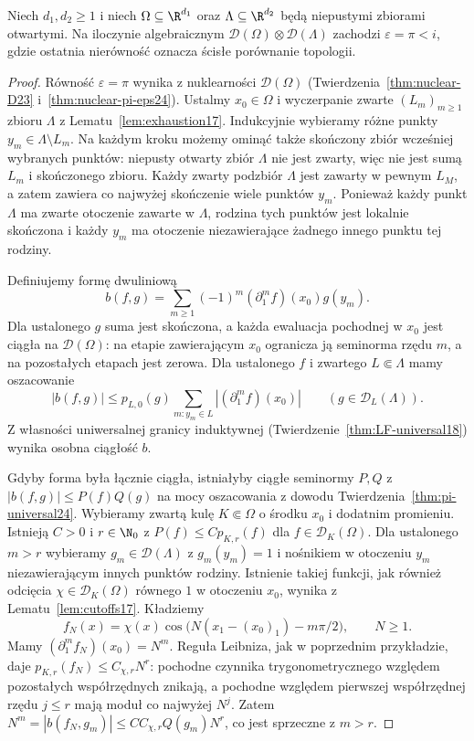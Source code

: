 \begin{wniosek}
\label{cor:dt-strict-i-pi-open}
Niech $d_1,d_2\ge1$ i niech $\Omega\subseteq\R^{d_1}$
oraz $\Lambda\subseteq\R^{d_2}$ będą niepustymi
zbiorami otwartymi. Na iloczynie algebraicznym
$\mathcal D(\Omega)\otimes\mathcal D(\Lambda)$
zachodzi $\varepsilon=\pi<i$, gdzie ostatnia
nierówność oznacza ścisłe porównanie topologii.
\end{wniosek}
\begin{proof}
Równość $\varepsilon=\pi$ wynika z nuklearności
$\mathcal D(\Omega)$ (Twierdzenia~\ref{thm:nuclear-D23}
i~\ref{thm:nuclear-pi-eps24}).
Ustalmy $x_0\in\Omega$ i wyczerpanie zwarte
$(L_m)_{m\ge1}$ zbioru $\Lambda$ z
Lematu~\ref{lem:exhaustion17}. Indukcyjnie wybieramy
różne punkty $y_m\in\Lambda\setminus L_m$.
Na każdym kroku możemy ominąć także skończony
zbiór wcześniej wybranych punktów: niepusty
otwarty zbiór $\Lambda$ nie jest zwarty, więc
nie jest sumą $L_m$ i skończonego zbioru.
Każdy zwarty podzbiór $\Lambda$ jest zawarty
w pewnym $L_M$, a zatem zawiera co najwyżej
skończenie wiele punktów $y_m$. Ponieważ każdy
punkt $\Lambda$ ma zwarte otoczenie zawarte
w $\Lambda$, rodzina tych punktów jest lokalnie
skończona i każdy $y_m$ ma otoczenie niezawierające
żadnego innego punktu tej rodziny.

Definiujemy formę dwuliniową
\[
 b(f,g)=\sum_{m\ge1}(-1)^m
 (\partial_1^m f)(x_0)g(y_m).
\]
Dla ustalonego $g$ suma jest skończona,
a każda ewaluacja pochodnej w $x_0$ jest
ciągła na $\mathcal D(\Omega)$: na etapie
zawierającym $x_0$ ogranicza ją seminorma
rzędu $m$, a na pozostałych etapach jest zerowa.
Dla ustalonego $f$ i zwartego $L\Subset\Lambda$
mamy oszacowanie
\[
 |b(f,g)|\le p_{L,0}(g)
 \sum_{m:y_m\in L}|(\partial_1^m f)(x_0)|
 \qquad(g\in\mathcal D_L(\Lambda)).
\]
Z własności uniwersalnej granicy induktywnej
(Twierdzenie~\ref{thm:LF-universal18}) wynika
osobna ciągłość $b$.

Gdyby forma była łącznie ciągła, istniałyby
ciągłe seminormy $P,Q$ z $|b(f,g)|\le P(f)Q(g)$
na mocy oszacowania z dowodu
Twierdzenia~\ref{thm:pi-universal24}.
Wybieramy zwartą kulę $K\Subset\Omega$
o środku $x_0$ i dodatnim promieniu. Istnieją
$C>0$ i $r\in\N_0$ z $P(f)\le Cp_{K,r}(f)$
dla $f\in\mathcal D_K(\Omega)$.
Dla ustalonego $m>r$ wybieramy
$g_m\in\mathcal D(\Lambda)$ z $g_m(y_m)=1$
i nośnikiem w otoczeniu $y_m$ niezawierającym
innych punktów rodziny. Istnienie takiej funkcji,
jak również odcięcia $\chi\in\mathcal D_K(\Omega)$
równego $1$ w otoczeniu $x_0$, wynika z
Lematu~\ref{lem:cutoffs17}.
Kładziemy
\[
 f_N(x)=\chi(x)\cos\bigl(N(x_1-(x_0)_1)-m\pi/2\bigr),
 \qquad N\ge1.
\]
Mamy $(\partial_1^m f_N)(x_0)=N^m$.
Reguła Leibniza, jak w poprzednim przykładzie,
daje $p_{K,r}(f_N)\le C_{\chi,r}N^r$:
pochodne czynnika trygonometrycznego względem
pozostałych współrzędnych znikają, a pochodne
względem pierwszej współrzędnej rzędu $j\le r$
mają moduł co najwyżej $N^j$.
Zatem $N^m=|b(f_N,g_m)|\le
CC_{\chi,r}Q(g_m)N^r$, co jest sprzeczne
z $m>r$.


\end{proof}

